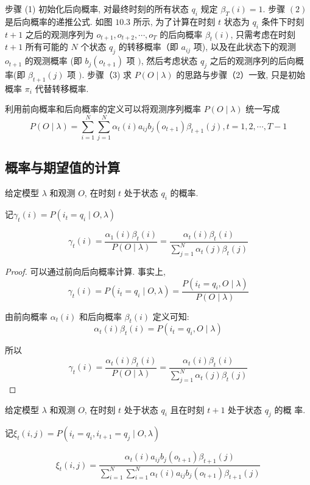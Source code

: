 步骤 (1) 初始化后向概率, 对最终时刻的所有状态 $ q_{i} $ 规定 $ \beta_{T}(i)=1 $. 步骤 $ (2) $ 是后向概率的递推公式. 如图 $ 10.3 $ 所示, 为了计算在时刻 $ t $ 状态为 $ q_{i} $ 条件下时刻$ t+1 $ 之后的观测序列为 $ o_{t+1}, o_{t+2}, \cdots, o_{T} $ 的后向概率 $ \beta_{t}(i) $, 只需考虑在时刻 $ t+1 $ 所有可能的 $ N $ 个状态 $ q_{j} $ 的转移概率（即 $ a_{i j} $ 项), 以及在此状态下的观测 $ o_{t+1} $ 的观测概率 (即 $ b_{j}\left(o_{t+1}\right) $ 项 $ ) $, 然后考虑状态 $ q_{j} $ 之后的观测序列的后向概率(即 $ \beta_{t+1}(j) $ 项 $ ) $. 步骤（3) 求 $ P(O \mid \lambda) $ 的思路与步骤（2）一致, 只是初始概率 $ \pi_{i} $ 代替转移概率.

利用前向概率和后向概率的定义可以将观测序列概率 $ P(O \mid \lambda) $ 统一写成
$$
P(O \mid \lambda)=\sum_{i=1}^{N} \sum_{j=1}^{N} \alpha_{t}(i) a_{i j} b_{j}\left(o_{t+1}\right) \beta_{t+1}(j), t=1,2, \cdots, T-1
$$

\subsection{概率与期望值的计算}

\begin{theorem}
    \label{Thm:ComputeGamma}
    给定模型 $ \lambda $ 和观测 $ O $, 在时刻 $ t $ 处于状态 $ q_{i} $ 的概率. 
    
    记$ \gamma_{t}(i)=P\left(i_{t}=q_{i} \mid O, \lambda\right) $

$$ \gamma_{t}(i)=\frac{\alpha_{1}(i) \beta_{t}(i)}{P(O \mid \lambda)}=\frac{\alpha_{t}(i) \beta_{t}(i)}{\sum_{j=1}^{N} \alpha_{t}(j) \beta_{t}(j)} $$
\end{theorem}


\begin{proof}
    可以通过前向后向概率计算. 事实上,
$$
\gamma_{t}(i)=P\left(i_{t}=q_{i} \mid O, \lambda\right)=\frac{P\left(i_{t}=q_{i}, O \mid \lambda\right)}{P(O \mid \lambda)}
$$

由前向概率 $ \alpha_{t}(i) $ 和后向概率 $ \beta_{t}(i) $ 定义可知:
$$
\alpha_{t}(i) \beta_{t}(i)=P\left(i_{t}=q_{i}, O \mid \lambda\right)
$$

所以
$$ \gamma_{t}(i)=\frac{\alpha_{t}(i) \beta_{t}(i)}{P(O \mid \lambda)}=\frac{\alpha_{t}(i) \beta_{t}(i)}{\sum_{j=1}^{N} \alpha_{t}(j) \beta_{t}(j)} $$
\end{proof}

\begin{theorem}
    \label{Thm:ComputeXi}
    给定模型 $ \lambda $ 和观测 $ O $, 在时刻 $ t $ 处于状态 $ q_{i} $ 且在时刻 $ t+1 $ 处于状态 $ q_{j} $ 的概 率. 
    
    记$ \xi_{t}(i, j)=P\left(i_{t}=q_{i}, i_{t+1}=q_{j} \mid O, \lambda\right) $

$$ \xi_{t}(i, j)=\frac{\alpha_{t}(i) a_{i j} b_{j}\left(o_{t+1}\right) \beta_{t+1}(j)}{\sum_{i=1}^{N} \sum_{i=1}^{N} \alpha_{t}(i) a_{i j} b_{j}\left(o_{t+1}\right) \beta_{t+1}(j)} $$
\end{theorem}



